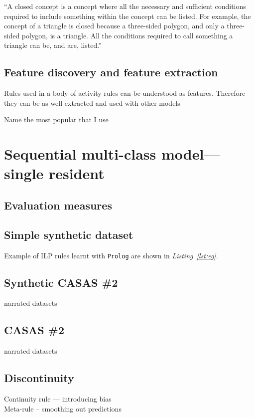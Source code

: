 \documentclass[12pt, a4paper, pdflatex, leqno, twoside, openright]{report}
\begin{document}
``A closed concept is a concept where all the necessary and sufficient conditions required to include something within the concept can be listed. For example, the concept of a triangle is closed because a three-sided polygon, and only a three-sided polygon, is a triangle. All the conditions required to call something a triangle can be, and are, listed.''

  \section{Feature discovery and feature extraction}
Rules used in a body of activity rules can be understood as features.
Therefore they can be as well extracted and used with other models

Name the most popular that I use


\chapter{Sequential multi-class model---single resident\label{ch:smcm}}
  \section{Evaluation measures}
  \section{Simple synthetic dataset}

Example of ILP rules learnt with \texttt{Prolog} are shown in \emph{Listing~\ref{lst:eg}}.

  \section{Synthetic CASAS \#2}
narrated datasets
  \section{CASAS \#2}
narrated datasets
  \section{Discontinuity}
Continuity rule --- introducing bias\\
Meta-rule -- smoothing out predictions
\end{document}
